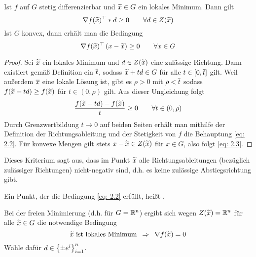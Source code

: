 \begin{aussage} %
	\label{aussage: 2.4}
	Ist $f$ auf $G$ stetig differenzierbar und $\widetilde{x} \in G$ ein lokales Minimum. Dann gilt
	\begin{equation} \label{eq: 2.2}
	\nabla f(\widetilde{x})^{\top} * d \ge 0 \qquad \forall d \in Z(\widetilde{x})
	\end{equation}
	Ist $G$ konvex, dann erhält man die Bedingung
	\begin{equation} \label{eq: 2.3}
	\nabla f(\widetilde{x})^{\top} \left( x - \widetilde{x} \right) \ge 0 \qquad \forall x \in G
	\end{equation}
\end{aussage}
\begin{proof}
	Sei $\widetilde{x}$ ein lokales Minimum und $d \in Z(\widetilde{x})$ eine zulässige Richtung. Dann existiert gemäß Definition ein $\overline{t}$, sodass $\widetilde{x} + td \in G$ für alle $t \in [0,\overline{t}]$ gilt. Weil außerdem $\overline{x}$ eine lokale Lösung ist, gibt es $\rho > 0$ mit $\rho < \overline{t}$ sodass $f(\widetilde{x} + td) \ge f(\widetilde{x})$ für $t \in (0,\rho)$ gilt. Aus dieser Ungleichung folgt
	\begin{equation*}
	\frac{f(\widetilde{x} - td) - f(\widetilde{x})}{t} \ge 0 \qquad \forall t \in (0,\rho)
	\end{equation*}
	Durch Grenzwertbildung $t \to 0$ auf beiden Seiten erhält man mithilfe der Definition der Richtungsableitung und der Stetigkeit von $f$ die Behauptung \eqref{eq: 2.2}.
	Für konvexe Mengen gilt stets $x - \widetilde{x} \in Z(\widetilde{x})$ für $x \in G$, also folgt \eqref{eq: 2.3}.
\end{proof}

Dieses Kriterium sagt aus, dass im Punkt $\widetilde{x}$ alle Richtungsableitungen (bezüglich zulässiger Richtungen) nicht-negativ sind, d.h. es keine zulässige Abstiegsrichtung gibt.

\begin{bemerkung} %
	Ein Punkt, der die Bedingung \eqref{eq: 2.2} erfüllt, heißt .
\end{bemerkung}

\begin{bemerkung} %
	\label{bemerkung: 2.3}
	Bei der freien Minimierung (d.h. für $G = \mathbb{R}^n$) ergibt sich wegen $Z(\widetilde{x}) = \mathbb{R}^n$ für alle $\widetilde{x} \in G$ die notwendige Bedingung
	\begin{equation*}
	\widetilde{x} \text{ ist lokales Minimum} \enskip \Rightarrow \enskip \nabla f(\widetilde{x}) = 0
	\end{equation*}
	Wähle dafür $d \in \left\{ \pm e^i \right\}_{i=1}^n$.
\end{bemerkung}

